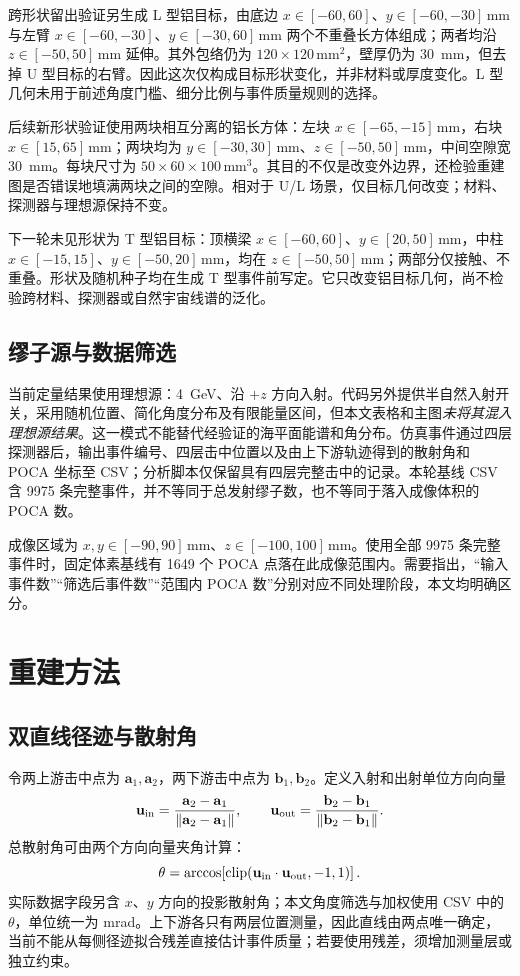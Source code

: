 \documentclass[UTF8,fontset=none,zihao=-4,a4paper]{ctexart}
\begin{document}
跨形状留出验证另生成 L 型铝目标，由底边 $x\in[-60,60]$、$y\in[-60,-30]$\,mm 与左臂 $x\in[-60,-30]$、$y\in[-30,60]$\,mm 两个不重叠长方体组成；两者均沿 $z\in[-50,50]$\,mm 延伸。其外包络仍为 $120\times120$\,mm$^2$，壁厚仍为 \SI{30}{mm}，但去掉 U 型目标的右臂。因此这次仅构成目标形状变化，并非材料或厚度变化。L 型几何未用于前述角度门槛、细分比例与事件质量规则的选择。

后续新形状验证使用两块相互分离的铝长方体：左块 $x\in[-65,-15]$\,mm，右块 $x\in[15,65]$\,mm；两块均为 $y\in[-30,30]$\,mm、$z\in[-50,50]$\,mm，中间空隙宽 \SI{30}{mm}。每块尺寸为 $50\times60\times100$\,mm$^3$。其目的不仅是改变外边界，还检验重建图是否错误地填满两块之间的空隙。相对于 U/L 场景，仅目标几何改变；材料、探测器与理想源保持不变。

下一轮未见形状为 T 型铝目标：顶横梁 $x\in[-60,60]$、$y\in[20,50]$\,mm，中柱 $x\in[-15,15]$、$y\in[-50,20]$\,mm，均在 $z\in[-50,50]$\,mm；两部分仅接触、不重叠。形状及随机种子均在生成 T 型事件前写定。它只改变铝目标几何，尚不检验跨材料、探测器或自然宇宙线谱的泛化。

\subsection{缪子源与数据筛选}
当前定量结果使用理想源：\SI{4}{GeV}、沿 $+z$ 方向入射。代码另外提供半自然入射开关，采用随机位置、简化角度分布及有限能量区间，但本文表格和主图\emph{未将其混入理想源结果}。这一模式不能替代经验证的海平面能谱和角分布。仿真事件通过四层探测器后，输出事件编号、四层击中位置以及由上下游轨迹得到的散射角和 POCA 坐标至 CSV；分析脚本仅保留具有四层完整击中的记录。本轮基线 CSV 含 \num{9975} 条完整事件，并不等同于总发射缪子数，也不等同于落入成像体积的 POCA 数。

成像区域为 $x,y\in[-90,90]$\,mm、$z\in[-100,100]$\,mm。使用全部 \num{9975} 条完整事件时，固定体素基线有 \num{1649} 个 POCA 点落在此成像范围内。需要指出，“输入事件数”“筛选后事件数”“范围内 POCA 数”分别对应不同处理阶段，本文均明确区分。

\section{重建方法}
\subsection{双直线径迹与散射角}
令两上游击中点为 $\mathbf a_1,\mathbf a_2$，两下游击中点为 $\mathbf b_1,\mathbf b_2$。定义入射和出射单位方向向量
\begin{equation}
\mathbf u_{\rm in}=\frac{\mathbf a_2-\mathbf a_1}{\|\mathbf a_2-\mathbf a_1\|},\qquad
\mathbf u_{\rm out}=\frac{\mathbf b_2-\mathbf b_1}{\|\mathbf b_2-\mathbf b_1\|}.
\end{equation}
总散射角可由两个方向向量夹角计算：
\begin{equation}
\theta=\arccos\!\left[\operatorname{clip}\!\left(\mathbf u_{\rm in}\cdot\mathbf u_{\rm out},-1,1\right)\right].
\label{eq:theta}
\end{equation}
实际数据字段另含 $x$、$y$ 方向的投影散射角；本文角度筛选与加权使用 CSV 中的 $\theta$，单位统一为 mrad。上下游各只有两层位置测量，因此直线由两点唯一确定，当前不能从每侧径迹拟合残差直接估计事件质量；若要使用残差，须增加测量层或独立约束。
\end{document}
